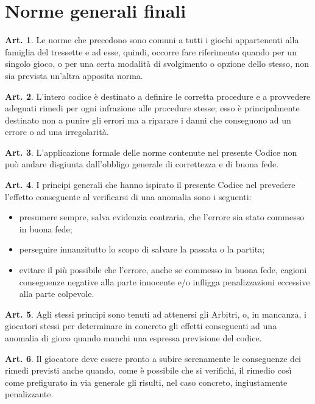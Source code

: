 \documentclass[italian,a4paper]{article}
\theoremstyle{definition}
\newtheorem{art}{Art.}
\newenvironment{packeditem}{
\begin{itemize}
  \setlength{\itemsep}{1pt}
  \setlength{\parskip}{0pt}
  \setlength{\parsep}{0pt}
}{\end{itemize}}
\begin{document}
\section{Norme generali finali}
\begin{art}
    Le norme che precedono sono comuni a tutti i giochi appartenenti alla famiglia del tressette e ad esse, quindi, occorre fare riferimento quando per un singolo gioco, o per una certa modalità di svolgimento o opzione dello stesso, non sia prevista un'altra apposita norma.
\end{art}
\begin{art}
    L'intero codice è destinato a definire le corretta procedure e a provvedere adeguati rimedi per ogni infrazione alle procedure stesse; esso è principalmente destinato non a punire gli errori ma a riparare i danni che conseguono ad un errore o ad una irregolarità.
\end{art}
\begin{art}
    L'applicazione formale delle norme contenute nel presente Codice non può andare disgiunta dall'obbligo generale di correttezza e di buona fede.
\end{art}
\begin{art}
    I principi generali che hanno ispirato il presente Codice nel prevedere l'effetto conseguente al verificarsi di una anomalia sono i seguenti:
    \begin{packeditem}
\item  presumere sempre, salva evidenzia contraria, che l'errore sia stato commesso in buona fede;
\item  perseguire innanzitutto lo scopo di salvare la passata o la partita;
\item  evitare il più possibile che l'errore, anche se commesso in buona fede, cagioni conseguenze negative alla parte innocente e/o infligga  penalizzazioni eccessive alla parte colpevole.
    \end{packeditem}
\end{art}
\begin{art}
    Agli stessi principi sono tenuti ad attenersi gli Arbitri, o, in mancanza, i giocatori stessi per determinare in concreto gli effetti conseguenti ad una anomalia di gioco quando manchi una  espressa previsione del codice.
\end{art}
\begin{art}
    Il giocatore deve essere pronto a subire serenamente le conseguenze dei rimedi previsti anche quando, come è possibile che si verifichi, il rimedio così come prefigurato in via generale gli risulti, nel caso concreto, ingiustamente penalizzante.
\end{art}
\end{document}
